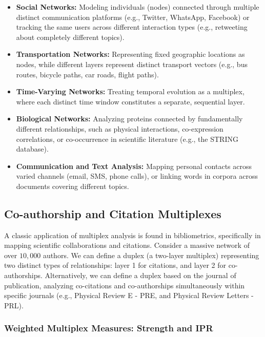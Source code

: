 \begin{itemize}
    \item \textbf{Social Networks:} Modeling individuals (nodes) connected through multiple distinct communication platforms (e.g., Twitter, WhatsApp, Facebook) or tracking the same users across different interaction types (e.g., retweeting about completely different topics).
    \item \textbf{Transportation Networks:} Representing fixed geographic locations as nodes, while different layers represent distinct transport vectors (e.g., bus routes, bicycle paths, car roads, flight paths).
    \item \textbf{Time-Varying Networks:} Treating temporal evolution as a multiplex, where each distinct time window constitutes a separate, sequential layer.
    \item \textbf{Biological Networks:} Analyzing proteins connected by fundamentally different relationships, such as physical interactions, co-expression correlations, or co-occurrence in scientific literature (e.g., the STRING database).
    \item \textbf{Communication and Text Analysis:} Mapping personal contacts across varied channels (email, SMS, phone calls), or linking words in corpora across documents covering different topics.
\end{itemize}

\subsection{Co-authorship and Citation Multiplexes}
\label{subsec:coauthorship_citation}

A classic application of multiplex analysis is found in bibliometrics, specifically in mapping scientific collaborations and citations. Consider a massive network of over \(10,000\) authors. We can define a duplex (a two-layer multiplex) representing two distinct types of relationships: layer 1 for citations, and layer 2 for co-authorships. Alternatively, we can define a duplex based on the journal of publication, analyzing co-citations and co-authorships simultaneously within specific journals (e.g., Physical Review E - PRE, and Physical Review Letters - PRL).

\subsubsection{Weighted Multiplex Measures: Strength and IPR}
\label{subsubsec:multiplex_measures}

